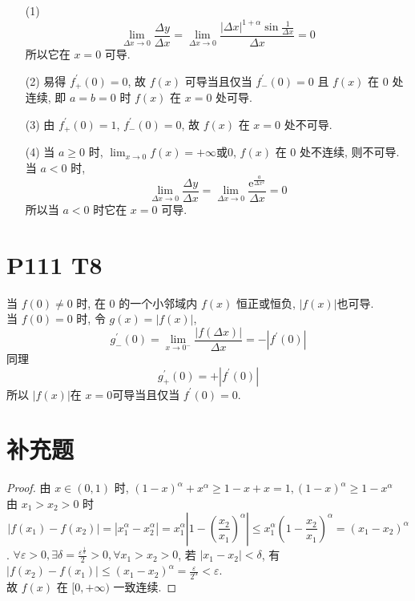 \documentclass{article}
\newcommand{\zte}{\mathrm{e}} %
\begin{document}
\begin{itemize}
    \item [(1)] \[
        \lim_{\Delta  x \to 0}\frac{\Delta  y}{\Delta  x} 
        = \lim_{\Delta  x \to 0}\frac{\left\lvert \Delta x \right\rvert^{1 + \alpha} \sin \frac{1}{\Delta x}}{\Delta x} = 0
    \]
    所以它在 $x = 0$ 可导.
    \item [(2)] 易得 $f_+^\prime(0) = 0$, 故 $f(x)$ 可导当且仅当 $f_-^\prime(0) = 0$ 且 $f(x)$ 在 0 处连续, 即 $a = b = 0$ 时 $f(x)$ 在 $x = 0$ 处可导.
    \item [(3)] 由 $f_+^\prime(0) = 1$, $f_-^\prime(0) = 0$, 故 $f(x)$ 在 $x = 0$ 处不可导.
    \item [(4)] 当 $a \geqslant 0$ 时, $\displaystyle{\lim_{x \to 0}f(x) = + \infty \text{或}0}$, $f(x)$ 在 0 处不连续, 则不可导. \\
    当 $a < 0$ 时, \[
        \lim_{\Delta  x \to 0}\frac{\Delta  y}{\Delta  x}
         = \lim_{\Delta x \to 0}\frac{\zte^{\frac{a}{\Delta x^2}}}{\Delta x} = 0
    \]
    所以当 $a < 0$ 时它在 $x = 0$ 可导.
\end{itemize}

\section*{P111 T8}

当 $f(0) \neq 0$ 时, 在 0 的一个小邻域内 $f(x)$ 恒正或恒负, $\left\lvert f(x)\right\rvert $也可导. \\
当 $f(0) = 0$ 时, 令 $g(x) = \left\lvert f(x)\right\rvert $, $$g_-^\prime(0) = \lim_{x \to 0^-}\frac{\left\lvert f(\Delta x)\right\rvert}{\Delta x} = -\left\lvert f^\prime(0)\right\rvert $$同理
$$
g_+^\prime(0) = +\left\lvert f^\prime(0)\right\rvert
$$
所以 $\left\lvert f(x)\right\rvert $在 $x = 0$可导当且仅当 $f^\prime(0) = 0$.

\section*{补充题}

\begin{proof}
    由 $x \in (0, 1)$ 时, $(1 - x)^\alpha + x^\alpha \geqslant 1 - x + x = 1, (1 - x)^\alpha \geqslant 1 - x^\alpha$ \\
    由 $x_1 > x_2 > 0$ 时 $$\left\lvert f(x_1) - f(x_2)\right\rvert  = \left\lvert x_1^\alpha - x_2^\alpha\right\rvert = x_1^\alpha \left\lvert \displaystyle{1 - \left(\frac{x_2}{x_1}\right)^\alpha}\right\rvert \leqslant x_1^\alpha \left(1 - \displaystyle{\frac{x_2}{x_1}}\right)^\alpha = \left(x_1 - x_2\right)^\alpha$$.
    $\displaystyle{\forall \varepsilon > 0, \exists \delta = \frac{\varepsilon^\frac{1}{\alpha}}{2}} > 0, \forall x_1 > x_2 > 0$, 若 $\left\lvert x_1 - x_2\right\rvert < \delta$, 有 $\left\lvert f(x_2) - f(x_1)\right\rvert \leqslant (x_1 - x_2)^\alpha = \displaystyle{\frac{\varepsilon}{2^\alpha}} < \varepsilon$. \\
    故 $f(x)$ 在 $[0, +\infty)$ 一致连续.
\end{proof}
\end{document}
